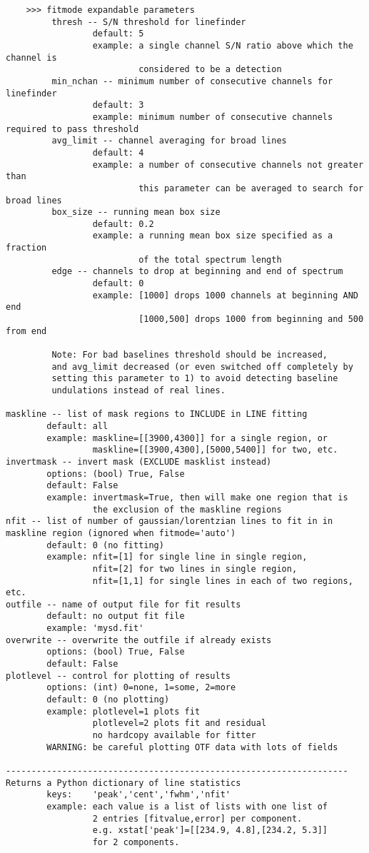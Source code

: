 \begin{verbatim}
    >>> fitmode expandable parameters             
         thresh -- S/N threshold for linefinder
                 default: 5
                 example: a single channel S/N ratio above which the channel is
                          considered to be a detection
         min_nchan -- minimum number of consecutive channels for linefinder
       	         default: 3
                 example: minimum number of consecutive channels required to pass threshold
         avg_limit -- channel averaging for broad lines
                 default: 4
                 example: a number of consecutive channels not greater than
                          this parameter can be averaged to search for broad lines
         box_size -- running mean box size
                 default: 0.2
                 example: a running mean box size specified as a fraction
                          of the total spectrum length
         edge -- channels to drop at beginning and end of spectrum
                 default: 0
                 example: [1000] drops 1000 channels at beginning AND end
                          [1000,500] drops 1000 from beginning and 500 from end

         Note: For bad baselines threshold should be increased,
         and avg_limit decreased (or even switched off completely by
         setting this parameter to 1) to avoid detecting baseline
         undulations instead of real lines.

maskline -- list of mask regions to INCLUDE in LINE fitting
        default: all
        example: maskline=[[3900,4300]] for a single region, or
                 maskline=[[3900,4300],[5000,5400]] for two, etc.
invertmask -- invert mask (EXCLUDE masklist instead)
        options: (bool) True, False
        default: False
        example: invertmask=True, then will make one region that is
                 the exclusion of the maskline regions
nfit -- list of number of gaussian/lorentzian lines to fit in in maskline region (ignored when fitmode='auto')
        default: 0 (no fitting)
        example: nfit=[1] for single line in single region,
                 nfit=[2] for two lines in single region,
                 nfit=[1,1] for single lines in each of two regions, etc.
outfile -- name of output file for fit results
        default: no output fit file
        example: 'mysd.fit'
overwrite -- overwrite the outfile if already exists
        options: (bool) True, False
        default: False
plotlevel -- control for plotting of results
        options: (int) 0=none, 1=some, 2=more
        default: 0 (no plotting)
        example: plotlevel=1 plots fit
                 plotlevel=2 plots fit and residual 
                 no hardcopy available for fitter
        WARNING: be careful plotting OTF data with lots of fields

-------------------------------------------------------------------
Returns a Python dictionary of line statistics
        keys:    'peak','cent','fwhm','nfit'
        example: each value is a list of lists with one list of
                 2 entries [fitvalue,error] per component.
                 e.g. xstat['peak']=[[234.9, 4.8],[234.2, 5.3]]
                 for 2 components.

\end{verbatim}

